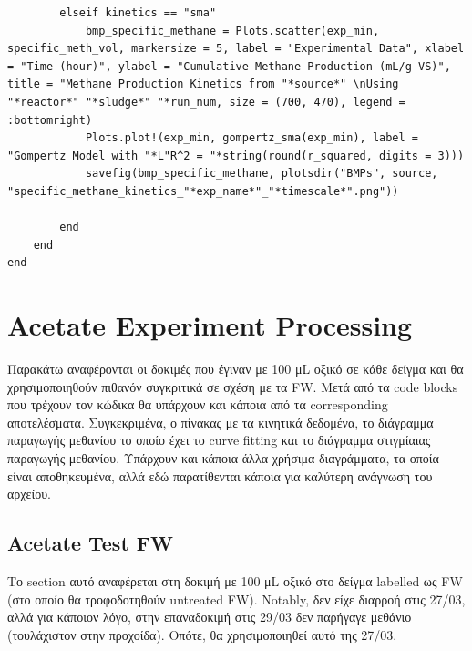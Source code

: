 \documentclass[11pt]{article}
\begin{document}
\begin{verbatim}
        elseif kinetics == "sma"
            bmp_specific_methane = Plots.scatter(exp_min, specific_meth_vol, markersize = 5, label = "Experimental Data", xlabel = "Time (hour)", ylabel = "Cumulative Methane Production (mL/g VS)", title = "Methane Production Kinetics from "*source*" \nUsing "*reactor*" "*sludge*" "*run_num, size = (700, 470), legend = :bottomright)
            Plots.plot!(exp_min, gompertz_sma(exp_min), label = "Gompertz Model with "*L"R^2 = "*string(round(r_squared, digits = 3)))
            savefig(bmp_specific_methane, plotsdir("BMPs", source, "specific_methane_kinetics_"*exp_name*"_"*timescale*".png"))

        end
    end
end

\end{verbatim}

\section{Acetate Experiment Processing}
\label{sec:org153116c}
Παρακάτω αναφέρονται οι δοκιμές που έγιναν με 100 μL οξικό σε κάθε δείγμα και θα χρησιμοποιηθούν πιθανόν συγκριτικά σε σχέση με τα FW. Μετά από τα code blocks που τρέχουν τον κώδικα θα υπάρχουν και κάποια από τα corresponding αποτελέσματα. Συγκεκριμένα, ο πίνακας με τα κινητικά δεδομένα, το διάγραμμα παραγωγής μεθανίου το οποίο έχει το curve fitting και το διάγραμμα στιγμίαιας παραγωγής μεθανίου. Υπάρχουν και κάποια άλλα χρήσιμα διαγράμματα, τα οποία είναι αποθηκευμένα, αλλά εδώ παρατίθενται κάποια για καλύτερη ανάγνωση του αρχείου.

\subsection{Acetate Test FW}
\label{sec:org37dd343}
Το section αυτό αναφέρεται στη δοκιμή με 100 μL οξικό στο δείγμα labelled ως FW (στο οποίο θα τροφοδοτηθούν untreated FW). Notably, δεν είχε διαρροή στις 27/03, αλλά για κάποιον λόγο, στην επαναδοκιμή στις 29/03 δεν παρήγαγε μεθάνιο (τουλάχιστον στην προχοίδα). Οπότε, θα χρησιμοποιηθεί αυτό της 27/03.
\end{document}
